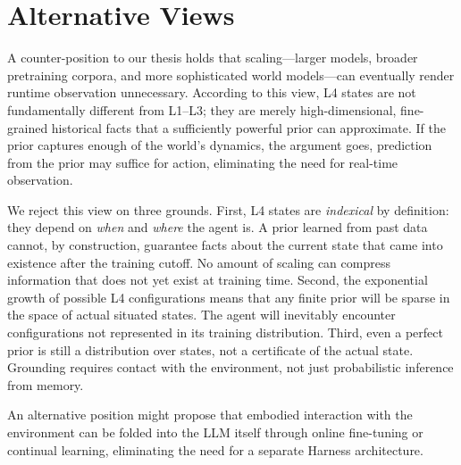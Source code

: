 \section{Alternative Views}

A counter-position to our thesis holds that scaling---larger models, broader pretraining corpora, and more sophisticated world models---can eventually render runtime observation unnecessary. According to this view, L4 states are not fundamentally different from L1--L3; they are merely high-dimensional, fine-grained historical facts that a sufficiently powerful prior can approximate. If the prior captures enough of the world's dynamics, the argument goes, prediction from the prior may suffice for action, eliminating the need for real-time observation.

We reject this view on three grounds. First, L4 states are \emph{indexical} by definition: they depend on \emph{when} and \emph{where} the agent is. A prior learned from past data cannot, by construction, guarantee facts about the current state that came into existence after the training cutoff. No amount of scaling can compress information that does not yet exist at training time. Second, the exponential growth of possible L4 configurations means that any finite prior will be sparse in the space of actual situated states. The agent will inevitably encounter configurations not represented in its training distribution. Third, even a perfect prior is still a distribution over states, not a certificate of the actual state. Grounding requires contact with the environment, not just probabilistic inference from memory.

An alternative position might propose that embodied interaction with the environment can be folded into the LLM itself through online fine-tuning or continual learning, eliminating the need for a separate Harness architecture.

